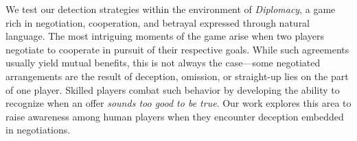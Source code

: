 


We test our detection strategies within the environment of  \textit{Diplomacy}, a game rich in negotiation, cooperation, and betrayal expressed through natural language. The most intriguing moments of the game arise when two players negotiate to cooperate in pursuit of their respective goals. While such agreements usually yield mutual benefits, this is not always the case---some negotiated arrangements are the result of deception, omission, or straight-up lies on the part of one player. Skilled players combat such behavior by developing the ability to recognize when an offer \textit{sounds too good to be true}. Our work explores this area to raise awareness among human players when they encounter deception embedded in negotiations. 

